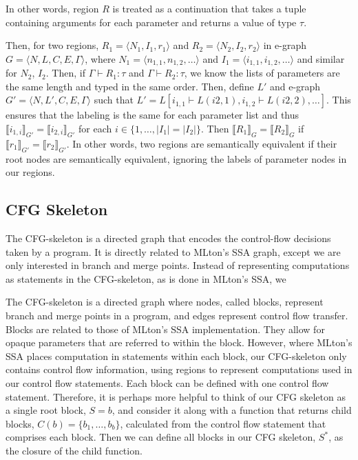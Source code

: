 \documentclass{article}
\begin{document}
In other words, region $R$ is treated as a continuation that takes a tuple containing arguments for each parameter and returns a value of type $\tau$.

Then, for two regions, $R_1 = \langle N_1, I_1, r_1 \rangle$ and $R_2 = \langle N_2, I_2, r_2 \rangle$ in e-graph $G=\langle N, L, C, E, \Gamma \rangle$, where $N_1 = \langle n_{1, 1}, n_{1, 2}, \dots \rangle$ and $I_1 = \langle i_{1, 1}, i_{1, 2}, \dots \rangle$ and similar for $N_2$, $I_2$. Then, if $\Gamma \vdash R_1 : \tau$ and $\Gamma \vdash R_2 : \tau$, we know the lists of parameters are the same length and typed in the same order. Then, define $L'$ and e-graph $G'=\langle N, L', C, E, \Gamma \rangle$ such that $L' = L[i_{1,1} \vdash L(i{2,1}), i_{1,2} \vdash L(i{2,2}), \dots ]$. This ensures that the labeling is the same for each parameter list and thus $\llbracket i_{1, i} \rrbracket_{G'} = \llbracket i_{2, i} \rrbracket_{G'}$ for each $i \in \{1, \dots, |I_1| = |I_2| \}$. Then $\llbracket R_1 \rrbracket_{G} = \llbracket R_2 \rrbracket_{G}$ if $\llbracket r_1 \rrbracket_{G'} = \llbracket r_2 \rrbracket_{G'}$. In other words, two regions are semantically equivalent if their root nodes are semantically equivalent, ignoring the labels of parameter nodes in our regions.

\subsection{CFG Skeleton}

The CFG-skeleton is a directed graph that encodes the control-flow decisions taken by a program. It is directly related to MLton's SSA graph, except we are only interested in branch and merge points. Instead of representing computations as statements in the CFG-skeleton, as is done in MLton's SSA, we

The CFG-skeleton is a directed graph where nodes, called blocks, represent branch and merge points in a program, and edges represent control flow transfer. Blocks are related to those of MLton's SSA implementation. They allow for opaque parameters that are referred to within the block. However, where MLton's SSA places computation in statements within each block, our CFG-skeleton only contains control flow information, using regions to represent computations used in our control flow statements. Each block can be defined with one control flow statement. Therefore, it is perhaps more helpful to think of our CFG skeleton as a single root block, $S = b$, and consider it along with a function that returns child blocks, $C(b) = \{b_1, \dots, b_b\}$, calculated from the control flow statement that comprises each block. Then we can define all blocks in our CFG skeleton, $S^*$, as the closure of the child function.
\end{document}
